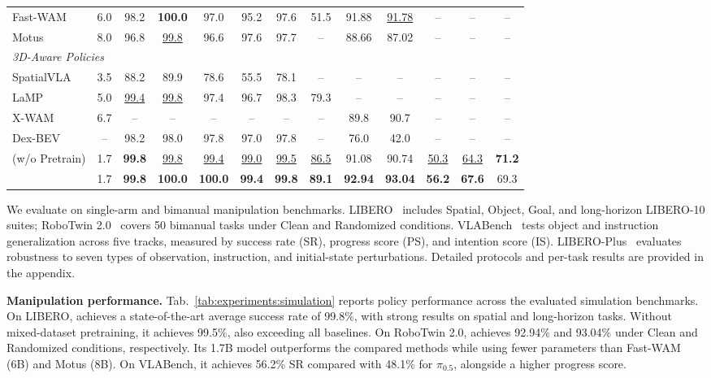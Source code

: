 \begin{table}[!b]
\begin{adjustbox}{max width=0.94\linewidth}
\begin{tabular}{@{}l*{12}{c}@{}}
        Fast-WAM & 6.0 & 98.2 & \textbf{100.0} & 97.0 & 95.2 & 97.6 & 51.5 & 91.88 & \underline{91.78} & -- & -- & -- \\
        Motus & 8.0 & 96.8 & \underline{99.8} & 96.6 & 97.6 & 97.7 & -- & 88.66 & 87.02 & -- & -- & -- \\
        \midrule
        \multicolumn{13}{l}{\textit{3D-Aware Policies}} \\
        SpatialVLA & 3.5 & 88.2 & 89.9 & 78.6 & 55.5 & 78.1 & -- & -- & -- & -- & -- & -- \\
        LaMP & 5.0 & \underline{99.4} & \underline{99.8} & 97.4 & 96.7 & 98.3 & 79.3 & -- & -- & -- & -- & -- \\
        X-WAM & 6.7 & -- & -- & -- & -- & -- & -- & 89.8 & 90.7 & -- & -- & -- \\
        Dex-BEV & -- & 98.2 & 98.0 & 97.8 & 97.0 & 97.8 & -- & 76.0 & 42.0 & -- & -- & -- \\
        \midrule
        \method{} (w/o Pretrain) & 1.7 & \textbf{99.8} & \underline{99.8} & \underline{99.4} & \underline{99.0} & \underline{99.5} & \underline{86.5} & 91.08 & 90.74 & \underline{50.3} & \underline{64.3} & \textbf{71.2} \\
        \method{} & 1.7 & \textbf{99.8} & \textbf{100.0} & \textbf{100.0} & \textbf{99.4} & \textbf{99.8} & \textbf{89.1} & \textbf{92.94} & \textbf{93.04} & \textbf{56.2} & \textbf{67.6} & 69.3 \\
        \bottomrule
    \end{tabular}
    \end{adjustbox}
    \vspace{-0.15cm}
\end{table}

We evaluate \method{} on single-arm and bimanual manipulation benchmarks.
LIBERO~\citep{liu2023libero} includes Spatial, Object, Goal, and
long-horizon LIBERO-10 suites; RoboTwin 2.0~\citep{chen2025robotwin}
covers 50 bimanual tasks under Clean and Randomized conditions.
VLABench~\citep{zhang2024vlabench} tests object and instruction
generalization across five tracks, measured by success rate (SR),
progress score (PS), and intention score (IS).
LIBERO-Plus~\citep{fei2025liberoplus} evaluates robustness to seven
types of observation, instruction, and initial-state perturbations.
Detailed protocols and per-task results are provided in the appendix.

\noindent\textbf{Manipulation performance.}
Tab.~\ref{tab:experiments:simulation} reports policy performance across
the evaluated simulation benchmarks. On LIBERO, \method{} achieves a
state-of-the-art average success rate of 99.8\%, with strong results
on spatial and long-horizon tasks. Without mixed-dataset pretraining,
it achieves 99.5\%, also exceeding all baselines.
On RoboTwin 2.0, \method{} achieves 92.94\% and 93.04\% under Clean
and Randomized conditions, respectively. Its 1.7B model outperforms
the compared methods while using fewer parameters than Fast-WAM (6B)
and Motus (8B). On VLABench, it achieves 56.2\% SR compared with
48.1\% for $\pi_{0.5}$, alongside a higher progress score.

